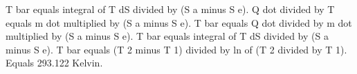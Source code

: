 T bar equals integral of T dS divided by (S a minus S e).  
Q dot divided by T equals m dot multiplied by (S a minus S e).  
T bar equals Q dot divided by m dot multiplied by (S a minus S e).  
T bar equals integral of T dS divided by (S a minus S e).  
T bar equals (T 2 minus T 1) divided by ln of (T 2 divided by T 1).  
Equals 293.122 Kelvin.